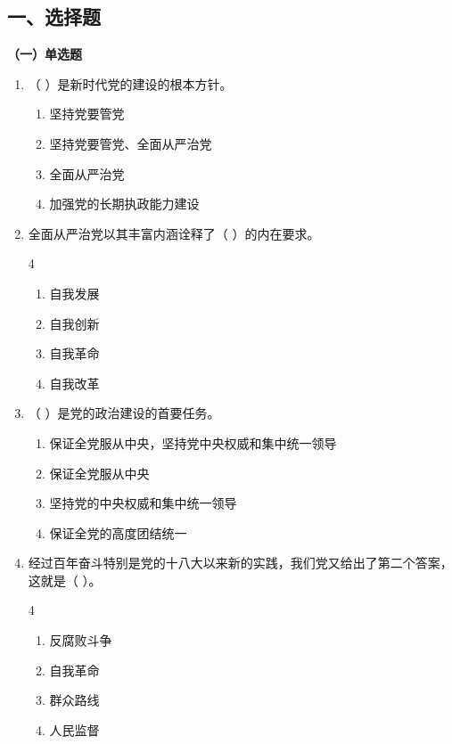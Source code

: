 \documentclass[a4paper,11pt]{ctexart}
\begin{document}
\subsection{一、选择题}

\textbf{（一）单选题}
\begin{enumerate}
    \item （ ）是新时代党的建设的根本方针。
    \begin{enumerate}
        \item 坚持党要管党
        \item 坚持党要管党、全面从严治党
        \item 全面从严治党
        \item 加强党的长期执政能力建设
    \end{enumerate}

    \item 全面从严治党以其丰富内涵诠释了（ ）的内在要求。
    \begin{multicols}{4}
    \begin{enumerate}
        \item 自我发展
        \item 自我创新
        \item 自我革命
        \item 自我改革
    \end{enumerate}
    \end{multicols}

    \item （ ）是党的政治建设的首要任务。
    \begin{enumerate}
        \item 保证全党服从中央，坚持党中央权威和集中统一领导
        \item 保证全党服从中央
        \item 坚持党的中央权威和集中统一领导
        \item 保证全党的高度团结统一
    \end{enumerate}

    \item 经过百年奋斗特别是党的十八大以来新的实践，我们党又给出了第二个答案，这就是（ ）。
    \begin{multicols}{4}
    \begin{enumerate}
        \item 反腐败斗争
        \item 自我革命
        \item 群众路线
        \item 人民监督
    \end{enumerate}
    \end{multicols}


\end{enumerate}
\end{document}
